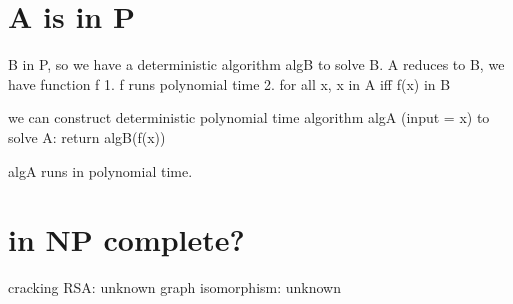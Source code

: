 \documentclass{article}
\begin{document}
\section{A is in P}
B in P, so we have a deterministic algorithm algB to solve B.
A reduces to B, we have function f
1. f runs polynomial time
2. for all x, x in A iff f(x) in B

we can construct deterministic polynomial time algorithm algA (input = x) to solve A:
return algB(f(x))

algA runs in polynomial time.

\section{in NP complete?}
cracking RSA: unknown
graph isomorphism: unknown
\end{document}
